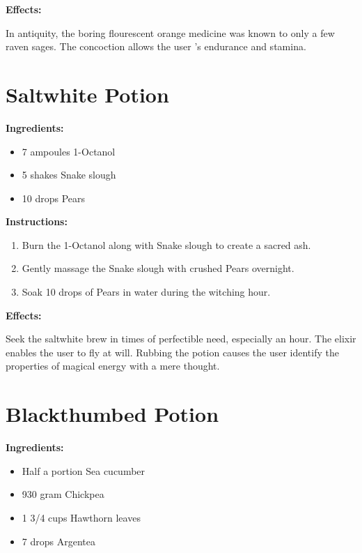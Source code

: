\documentclass{article}
\begin{document}
\textbf{Effects:}

In antiquity, the boring flourescent orange medicine was known to only a few raven sages. The concoction allows the user 's endurance and stamina.

\newpage
\section*{Saltwhite Potion}

\textbf{Ingredients:}

\begin{itemize}
  \item 7 ampoules 1-Octanol
  \item 5 shakes Snake slough
  \item 10 drops Pears
\end{itemize}

\textbf{Instructions:}

\begin{enumerate}
  \item Burn the 1-Octanol along with Snake slough to create a sacred ash.
  \item Gently massage the Snake slough with crushed Pears overnight.
  \item Soak 10 drops of Pears in water during the witching hour.
\end{enumerate}

\textbf{Effects:}

Seek the saltwhite brew in times of perfectible need, especially an hour. The elixir enables the user to fly at will. Rubbing the potion causes the user identify the properties of magical energy with a mere thought.

\newpage
\section*{Blackthumbed Potion}

\textbf{Ingredients:}

\begin{itemize}
  \item Half a portion Sea cucumber
  \item 930 gram Chickpea
  \item 1 3/4 cups Hawthorn leaves
  \item 7 drops Argentea
\end{itemize}
\end{document}

